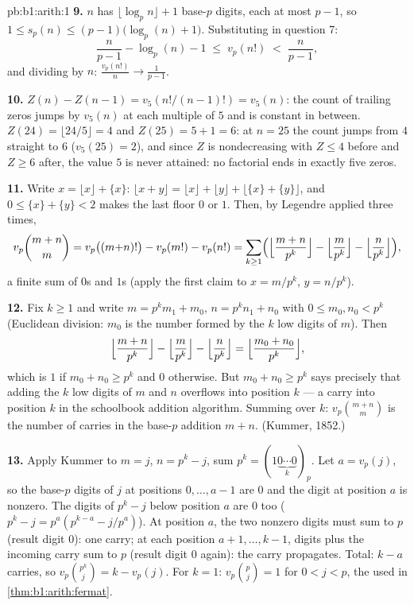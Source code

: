 \begin{solution}{pb:b1:arith:1}
\textbf{9.} $n$ has $\lfloor \log_p n \rfloor + 1$ base-$p$
digits, each at most $p - 1$, so $1 \leq s_p(n) \leq
(p-1)\bigl(\log_p(n) + 1\bigr)$. Substituting in question 7:
\[
\frac n{p-1} - \log_p(n) - 1 \;\leq\; v_p(n!) \;<\; \frac n{p-1},
\]
and dividing by $n$: $\frac{v_p(n!)}n \to \frac1{p-1}$.

\textbf{10.} $Z(n) - Z(n-1) = v_5(n!/(n-1)!) = v_5(n)$: the count
of trailing zeros jumps by $v_5(n)$ at each multiple of $5$ and is
constant in between. $Z(24) = \lfloor24/5\rfloor = 4$ and $Z(25) =
5 + 1 = 6$: at $n = 25$ the count jumps from $4$ straight to $6$
($v_5(25) = 2$), and since $Z$ is nondecreasing with $Z \leq 4$
before and $Z \geq 6$ after, the value $5$ is never attained: no
factorial ends in exactly five zeros.

\textbf{11.} Write $x = \lfloor x\rfloor + \{x\}$: $\lfloor x +
y\rfloor = \lfloor x\rfloor + \lfloor y\rfloor + \lfloor \{x\} +
\{y\}\rfloor$, and $0 \leq \{x\} + \{y\} < 2$ makes the last floor
$0$ or $1$. Then, by Legendre applied three times,
\[
v_p\binom{m+n}m = v_p\bigl((m{+}n)!\bigr) - v_p(m!) - v_p(n!)
= \sum_{k\geq1}\Bigl(
\Bigl\lfloor\frac{m+n}{p^k}\Bigr\rfloor
- \Bigl\lfloor\frac{m}{p^k}\Bigr\rfloor
- \Bigl\lfloor\frac{n}{p^k}\Bigr\rfloor\Bigr),
\]
a finite sum of $0$s and $1$s (apply the first claim to $x =
m/p^k$, $y = n/p^k$).

\textbf{12.} Fix $k \geq 1$ and write $m = p^km_1 + m_0$, $n =
p^kn_1 + n_0$ with $0 \leq m_0, n_0 < p^k$ (Euclidean division:
$m_0$ is the number formed by the $k$ low digits of $m$). Then
\[
\Bigl\lfloor\frac{m+n}{p^k}\Bigr\rfloor
- \Bigl\lfloor\frac m{p^k}\Bigr\rfloor
- \Bigl\lfloor\frac n{p^k}\Bigr\rfloor
= \Bigl\lfloor\frac{m_0 + n_0}{p^k}\Bigr\rfloor ,
\]
which is $1$ if $m_0 + n_0 \geq p^k$ and $0$ otherwise. But $m_0 +
n_0 \geq p^k$ says precisely that adding the $k$ low digits of $m$
and $n$ overflows into position $k$ --- a carry into position $k$
in the schoolbook addition algorithm. Summing over $k$:
$v_p\binom{m+n}m$ is the number of carries in the base-$p$
addition $m + n$. (Kummer, 1852.)

\textbf{13.} Apply Kummer to $m = j$, $n = p^k - j$, sum $p^k =
(1\underbrace{0\cdots0}_{k})_p$. Let $a = v_p(j)$, so the base-$p$
digits of $j$ at positions $0, \dots, a-1$ are $0$ and the digit
at position $a$ is nonzero. The digits of $p^k - j$ below position
$a$ are $0$ too ($p^k - j = p^a(p^{k-a} - j/p^a)$). At position
$a$, the two nonzero digits must sum to $p$ (result digit $0$):
one carry; at each position $a+1, \dots, k-1$, digits plus the
incoming carry sum to $p$ (result digit $0$ again): the carry
propagates. Total: $k - a$ carries, so $v_p\binom{p^k}j = k -
v_p(j)$. For $k = 1$: $v_p\binom pj = 1$ for $0 < j < p$, the
 used in \cref{thm:b1:arith:fermat}.


\end{solution}

